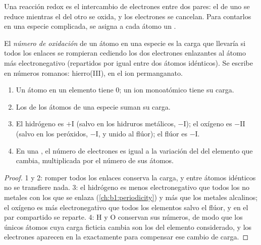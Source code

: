 Una reacción redox es el intercambio de electrones entre dos pares: el
 de uno se reduce mientras el  del otro se oxida, y los
electrones se cancelan. Para contarlos en una especie complicada, se
asigna a cada átomo un .

\begin{definition}\label{def:b1:nernst:oxidation-number}
El \emph{número de oxidación} de un átomo en una
especie es la carga que llevaría si todos los enlaces se rompieran
cediendo los dos electrones enlazantes al átomo más electronegativo
(repartidos por igual entre dos átomos idénticos). Se escribe en números
romanos: hierro(III),  en el ion permanganato.
\end{definition}

\begin{proposition}\label{prop:b1:nernst:on-rules}
\begin{enumerate}
  \item Un átomo en un elemento tiene  0; un ion
        monoatómico tiene su carga.
  \item Los  de los átomos de una especie suman su
        carga.
  \item El hidrógeno es $+$I (salvo en los hidruros metálicos, $-$I); el
        oxígeno es $-$II (salvo en los peróxidos, $-$I, y unido al flúor);
        el flúor es $-$I.
  \item En una , el número de electrones es igual a la
        variación del  del elemento que cambia,
        multiplicada por el número de sus átomos.
\end{enumerate}
\end{proposition}

\begin{proof}
1 y 2: romper todos los enlaces conserva la carga, y entre átomos
idénticos no se transfiere nada. 3: el hidrógeno es menos
electronegativo que todos los no metales con los que se enlaza
(\cref{ch:b1:periodicity}) y más que los metales alcalinos; el oxígeno es
más electronegativo que todos los elementos salvo el flúor, y en
 el par compartido se reparte. 4: H y O conservan sus números, de
modo que los únicos átomos cuya carga ficticia cambia son los del
elemento considerado, y los electrones aparecen en la 
exactamente para compensar ese cambio de carga.
\end{proof}

